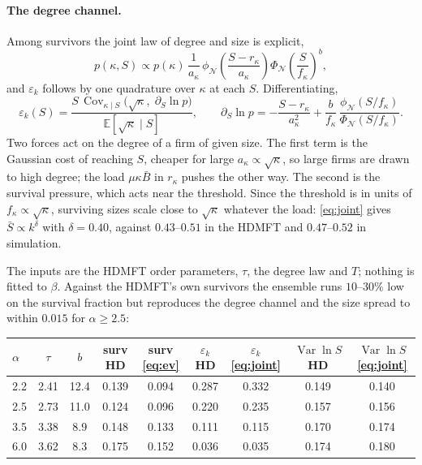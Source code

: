\documentclass[11pt]{article}
\newcommand{\E}{\mathbb E}
\newcommand{\Var}{\operatorname{Var}}
\newcommand{\Cov}{\operatorname{Cov}}
\newcommand{\PhiN}{\Phi_{\mathcal N}}
\newcommand{\phiN}{\phi_{\mathcal N}}
\begin{document}
\paragraph{The degree channel.}  Among survivors the joint law of degree and size is explicit,
\begin{equation}
  p(\kappa,S)\propto p(\kappa)\,\frac1{a_\kappa}\,\phiN\!\left(\frac{S-r_\kappa}{a_\kappa}\right)
  \PhiN\!\left(\frac S{f_\kappa}\right)^{b},
  \label{eq:joint}
\end{equation}
and $\varepsilon_k$ follows by one quadrature over $\kappa$ at each $S$.  Differentiating,
\begin{equation}
  \varepsilon_k(S)=\frac{S\,\Cov_{\kappa\mid S}\bigl(\sqrt\kappa,\;\partial_S\ln p\bigr)}{\E[\sqrt\kappa\mid S]},
  \qquad
  \partial_S\ln p=-\frac{S-r_\kappa}{a_\kappa^2}+\frac{b}{f_\kappa}\,\frac{\phiN(S/f_\kappa)}{\PhiN(S/f_\kappa)}.
  \label{eq:epscov}
\end{equation}
Two forces act on the degree of a firm of given size.  The first term is the Gaussian cost of
reaching $S$, cheaper for large $a_\kappa\propto\sqrt\kappa$, so large firms are drawn to high degree;
the load $\mu\kappa\bar B$ in $r_\kappa$ pushes the other way.  The second is the survival pressure,
which acts near the threshold.  Since the threshold is in units of $f_\kappa\propto\sqrt\kappa$,
surviving sizes scale close to $\sqrt\kappa$ whatever the load: \eqref{eq:joint} gives
$\bar S\propto k^{\delta}$ with $\delta=0.40$, against $0.43$--$0.51$ in the HDMFT and $0.47$--$0.52$
in simulation.

The inputs are the HDMFT order parameters, $\tau$, the degree law and $T$; nothing is fitted to
$\beta$.  Against the HDMFT's own survivors the ensemble runs $10$--$30\%$ low on the survival
fraction but reproduces the degree channel and the size spread to within $0.015$ for
$\alpha\ge2.5$:

\begin{center}\small\setlength{\tabcolsep}{4pt}
\begin{tabular}{lcc|cc|cc|cc}
\toprule
$\alpha$ & $\tau$ & $b$ & surv HD & surv \eqref{eq:ev} & $\varepsilon_k$ HD & $\varepsilon_k$ \eqref{eq:joint} & $\Var\ln S$ HD & $\Var\ln S$ \eqref{eq:joint}\\
\midrule
2.2 & 2.41 & 12.4 & 0.139 & 0.094 & 0.287 & 0.332 & 0.149 & 0.140\\
2.5 & 2.73 & 11.0 & 0.124 & 0.096 & 0.220 & 0.235 & 0.157 & 0.156\\
3.5 & 3.38 & 8.9  & 0.148 & 0.133 & 0.111 & 0.115 & 0.170 & 0.174\\
6.0 & 3.62 & 8.3  & 0.175 & 0.152 & 0.036 & 0.035 & 0.174 & 0.180\\
\bottomrule
\end{tabular}
\end{center}
\end{document}
